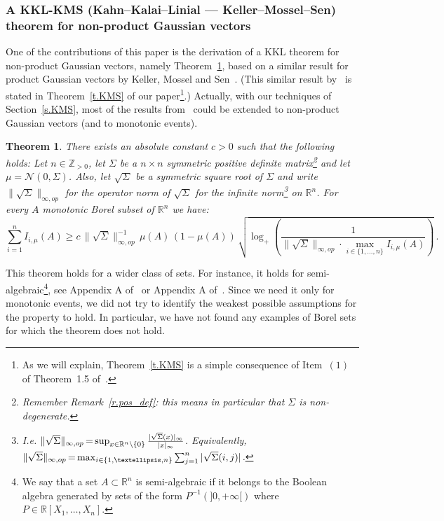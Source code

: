 \documentclass[11pt]{article}
\newtheorem{theo}{Theorem}[section]
\theoremstyle{definition}
\numberwithin{equation}{section}
\newcommand{\R}{\mathbb{R}}
\newcommand{\Z}{\mathbb{Z}}
\renewcommand{\Z}{\mathbb{Z}}
\newcommand*{\Mk}{\mkern -2mu}
\begin{document}
\subsubsection{A KKL-KMS (Kahn--Kalai--Linial --- Keller--Mossel--Sen) theorem for non-product Gaussian vectors}\label{sss.KMS}

One of the contributions of this paper is the derivation of a KKL theorem for non-product Gaussian vectors, namely Theorem~\ref{t.KMSnonproduct}, based on a similar result for product Gaussian vectors by Keller, Mossel and Sen~\cite{keller2012geometric}. (This similar result by~\cite{keller2012geometric} is stated in Theorem~\ref{t.KMS} of our paper\footnote{As we will explain, Theorem~\ref{t.KMS} is a simple consequence of Item~$(1)$ of Theorem~1.5 of~\cite{keller2012geometric}.}.) Actually, with our techniques of Section~\ref{s.KMS}, most of the results from~\cite{keller2012geometric} could be extended to non-product Gaussian vectors (and to monotonic events).

\begin{theo}\label{t.KMSnonproduct}
There exists an absolute constant $c > 0$ such that the following holds: Let $n \in \Z_{>0}$, let $\Sigma$ be a $n \times n$ symmetric positive definite matrix\footnote{Remember Remark~\ref{r.pos_def}: this means in particular that $\Sigma$ is non-degenerate.} and let $\mu = \mathcal{N}(0,\Sigma)$. Also, let $\sqrt{\Sigma}$ be a symmetric square root of $\Sigma$ and write $\| \sqrt{\Sigma} \|_{\infty,op}$ for the operator norm of $\sqrt{\Sigma}$ for the infinite norm\footnote{I.e. $\| \sqrt{\Sigma} \|_{\infty,op} \Mk=\Mk \sup_{x\in \R^n \setminus \{0\}} \frac{|\sqrt{\Sigma}(x) |_\infty}{| x |_\infty}$. Equivalently, $\| \sqrt{\Sigma} \|_{\infty,op} \Mk=\Mk\max_{i \in \lbrace 1,\dots, n \rbrace} \sum_{j=1}^n |\sqrt{\Sigma}(i,j)|$.} on $\R^n$. For every $A$ monotonic Borel subset of $\R^n$ we have:
\[
\sum_{i=1}^n I_{i,\mu}(A) \geq c \, \| \sqrt{\Sigma} \|_{\infty,op}^{-1} \, \mu(A) \, (1-\mu(A)) \, \sqrt{\log_+ \left(\frac{1}{\| \sqrt{\Sigma} \|_{\infty,op} \cdot \max_{i \in \lbrace 1,\dots, n \rbrace} I_{i,\mu}(A)} \right)} \,.
\]
\end{theo}

This theorem holds for a wider class of sets. For instance, it holds for semi-algebraic\footnote{We say that a set $A\subset\R^n$ is semi-algebraic if it belongs to the Boolean algebra generated by sets of the form $P^{-1}\left(]0,+\infty[\right)$ where $P\in\R[X_1,\dots,X_n]$.}, see Appendix A of~\cite[Chapter~7]{alelele} or Appendix A of~\cite[Chapter~2]{hugogogo}. Since we need it only for monotonic events, we did not try to identify the weakest possible assumptions for the property to hold. In particular, we have not found any examples of Borel sets for which the theorem does not hold.
\end{document}
